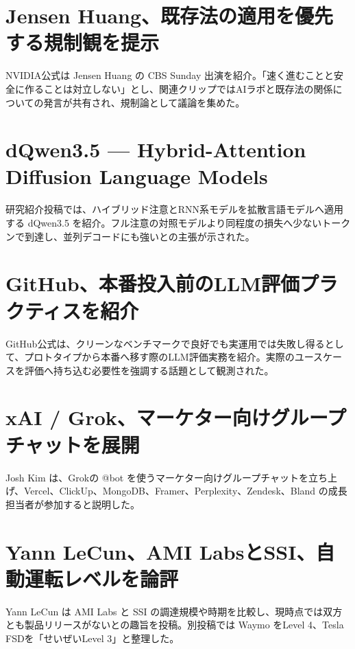 \section{Jensen Huang、既存法の適用を優先する規制観を提示}
NVIDIA公式は Jensen Huang の CBS Sunday 出演を紹介。「速く進むことと安全に作ることは対立しない」とし、関連クリップではAIラボと既存法の関係についての発言が共有され、規制論として議論を集めた。

\section{dQwen3.5 — Hybrid-Attention Diffusion Language Models}
研究紹介投稿では、ハイブリッド注意とRNN系モデルを拡散言語モデルへ適用する dQwen3.5 を紹介。フル注意の対照モデルより同程度の損失へ少ないトークンで到達し、並列デコードにも強いとの主張が示された。

\section{GitHub、本番投入前のLLM評価プラクティスを紹介}
GitHub公式は、クリーンなベンチマークで良好でも実運用では失敗し得るとして、プロトタイプから本番へ移す際のLLM評価実務を紹介。実際のユースケースを評価へ持ち込む必要性を強調する話題として観測された。

\section{xAI / Grok、マーケター向けグループチャットを展開}
Josh Kim は、Grokの @bot を使うマーケター向けグループチャットを立ち上げ、Vercel、ClickUp、MongoDB、Framer、Perplexity、Zendesk、Bland の成長担当者が参加すると説明した。

\section{Yann LeCun、AMI LabsとSSI、自動運転レベルを論評}
Yann LeCun は AMI Labs と SSI の調達規模や時期を比較し、現時点では双方とも製品リリースがないとの趣旨を投稿。別投稿では Waymo をLevel 4、Tesla FSDを「せいぜいLevel 3」と整理した。

